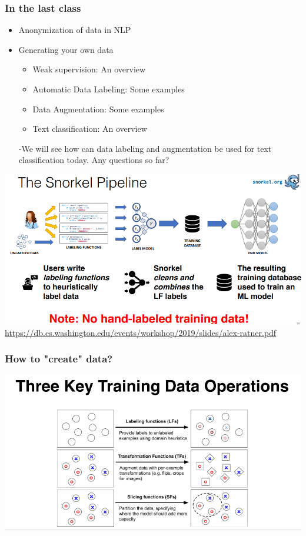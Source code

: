 \documentclass{beamer}
\begin{document}
\begin{frame}
\frametitle{In the last class}
\begin{itemize}
    \item Anonymization of data in NLP 
    \item Generating your own data
        \begin{itemize}
    \item Weak supervision: An overview
    \item Automatic Data Labeling: Some examples
    \item Data Augmentation: Some examples
    \item Text classification: An overview
    \end{itemize}
-We will see how can data labeling and augmentation be used for text classification today.  Any questions so far?
\end{itemize}
\end{frame}


\begin{frame}{}
    \includegraphics[width=\textwidth]{figures/snorkelradiologyexample.PNG}
    \href{Source}{https://db.cs.washington.edu/events/workshop/2019/slides/alex-ratner.pdf}
\end{frame}

\begin{frame}
\frametitle{How to "create" data?}
    \includegraphics[width=\textwidth]{figures/3snorkelops.PNG}
\end{frame}
\end{document}
